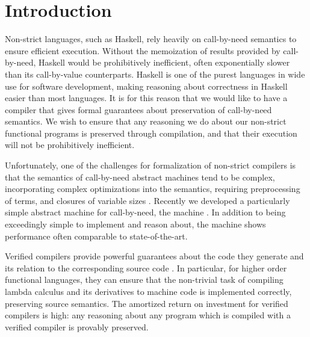 \section{Introduction} \label{sec:introduction}
Non-strict languages, such as Haskell, rely heavily on call-by-need semantics to
ensure efficient execution. Without the memoization of results provided by
call-by-need, Haskell would be prohibitively inefficient, often exponentially
slower than its call-by-value counterparts. Haskell is one of the purest
languages in wide use for software development, making reasoning about
correctness in Haskell easier than most languages. It is for this reason that
we would like to have a compiler that gives formal guarantees about preservation
of call-by-need semantics. We wish to ensure that any reasoning we do about
our non-strict functional programs is preserved through compilation, and that
their execution will not be prohibitively inefficient.

Unfortunately, one of the challenges for formalization of non-strict compilers
is that the semantics of call-by-need abstract machines tend to be complex,
incorporating complex optimizations into the semantics, requiring preprocessing
of terms, and closures of variable sizes \cite{jonesstg, TIM}. Recently we
developed a particularly simple abstract machine for call-by-need, the
\ce machine \cite{cem}. In addition to being exceedingly simple to
implement and reason about, the machine shows performance often comparable to
state-of-the-art.

Verified compilers provide powerful guarantees about the code they generate and
its relation to the corresponding source code \cite{chlipala2007certified,
leroy2012compcert, cakeml14}.  In particular, for higher order functional
languages, they can ensure that the non-trivial task of compiling lambda
calculus and its derivatives to machine code is implemented correctly,
preserving source semantics. The amortized return on investment for verified
compilers is high: any reasoning about any program which is compiled with a
verified compiler is provably preserved. 

